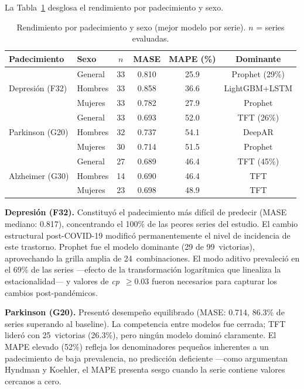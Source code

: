 \documentclass[12pt,a4paper]{article}
\begin{document}
La Tabla~\ref{tab:padecimiento} desglosa el rendimiento por padecimiento y sexo.

\begin{table}[ht]
\centering
\caption{Rendimiento por padecimiento y sexo (mejor modelo por serie). $n$ = series evaluadas.}
\label{tab:padecimiento}
\begin{tabular}{@{}llcccc@{}}
\toprule
\textbf{Padecimiento} & \textbf{Sexo} & $n$ & \textbf{MASE} & \textbf{MAPE (\%)} & \textbf{Dominante} \\
\midrule
\multirow{3}{*}{Depresión (F32)}
  & General  & 33 & 0.810 & 25.9 & Prophet (29\%) \\
  & Hombres  & 33 & 0.858 & 36.6 & LightGBM+LSTM \\
  & Mujeres  & 33 & 0.782 & 27.9 & Prophet \\
\midrule
\multirow{3}{*}{Parkinson (G20)}
  & General  & 33 & 0.693 & 52.0 & TFT (26\%) \\
  & Hombres  & 32 & 0.737 & 54.1 & DeepAR \\
  & Mujeres  & 30 & 0.714 & 51.5 & Prophet \\
\midrule
\multirow{3}{*}{Alzheimer (G30)}
  & General  & 27 & 0.689 & 46.4 & TFT (45\%) \\
  & Hombres  & 14 & 0.690 & 46.4 & TFT \\
  & Mujeres  & 23 & 0.698 & 48.9 & TFT \\
\bottomrule
\end{tabular}
\end{table}

\noindent\textbf{Depresión (F32).}
Constituyó el padecimiento más difícil de predecir (MASE mediano: 0.817), concentrando el 100\% de las peores series del estudio. El cambio estructural post-COVID-19 modificó permanentemente el nivel de incidencia de este trastorno. Prophet fue el modelo dominante (29 de 99~victorias), aprovechando la grilla amplia de 24~combinaciones. El modo aditivo prevaleció en el 69\% de las series ---efecto de la transformación logarítmica que linealiza la estacionalidad--- y valores de \textit{cp}~$\geq 0.03$ fueron necesarios para capturar los cambios post-pandémicos.

\noindent\textbf{Parkinson (G20).}
Presentó desempeño equilibrado (MASE: 0.714, 86.3\% de series superando al baseline). La competencia entre modelos fue cerrada; TFT lideró con 25~victorias (26.3\%), pero ningún modelo dominó claramente. El MAPE elevado (52\%) refleja los denominadores pequeños inherentes a un padecimiento de baja prevalencia, no predicción deficiente ---como argumentan Hyndman y Koehler, el MAPE presenta sesgo cuando la serie contiene valores cercanos a cero.~\cite{hyndman2006}
\end{document}
